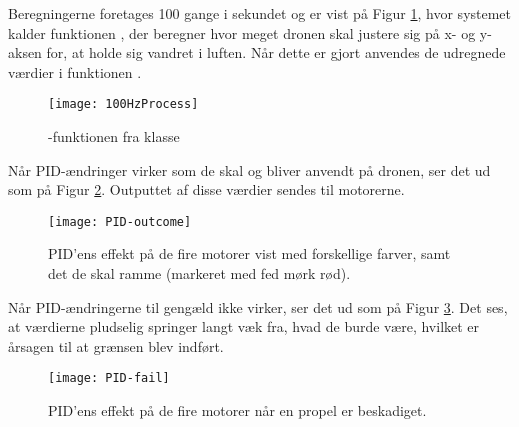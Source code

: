 \documentclass[Main]{subfiles}
\begin{document}
Beregningerne foretages 100 gange i sekundet og er vist på Figur \ref{Fig:100HzProcess}, hvor systemet kalder funktionen , der beregner hvor meget dronen skal justere sig på x- og y-aksen for, at holde sig vandret i luften.
Når dette er gjort anvendes de udregnede værdier i funktionen .

\begin{figure}[H]
\centering
\texttt{[image: 100HzProcess]}
\caption{-funktionen fra klasse }
\label{Fig:100HzProcess}
\end{figure}

Når PID-ændringer virker som de skal og bliver anvendt på dronen, ser det ud som på Figur \ref{Fig:PID-outcome}. 
Outputtet af disse værdier sendes til motorerne.

\begin{figure}[htbp]
\centering
\texttt{[image: PID-outcome]}
\caption{PID'ens effekt på de fire motorer vist med forskellige farver, samt det de skal ramme (markeret med fed mørk rød).}
\label{Fig:PID-outcome}
\end{figure}

Når PID-ændringerne til gengæld ikke virker, ser det ud som på Figur \ref{Fig:PID-fail}.
Det ses, at værdierne pludselig springer langt væk fra, hvad de burde være, hvilket er årsagen til at grænsen blev indført.

\begin{figure}[htbp]
\centering
\texttt{[image: PID-fail]}
\caption{PID'ens effekt på de fire motorer når en propel er beskadiget.}
\label{Fig:PID-fail}
\end{figure}
\end{document}
